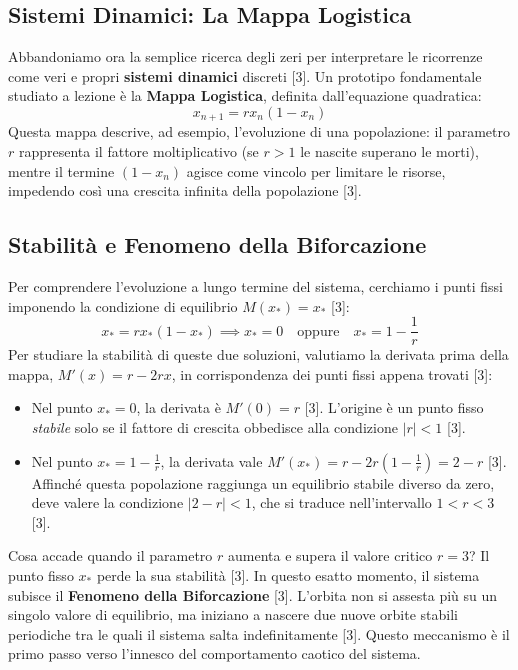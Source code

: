 \documentclass[12pt,a4paper]{article}
\begin{document}
\subsection{Sistemi Dinamici: La Mappa Logistica}
Abbandoniamo ora la semplice ricerca degli zeri per interpretare le ricorrenze come veri e propri \textbf{sistemi dinamici} discreti [3]. Un prototipo fondamentale studiato a lezione è la \textbf{Mappa Logistica}, definita dall'equazione quadratica:
\begin{equation}
x_{n+1} = r x_n (1 - x_n)
\end{equation}
Questa mappa descrive, ad esempio, l'evoluzione di una popolazione: il parametro $r$ rappresenta il fattore moltiplicativo (se $r>1$ le nascite superano le morti), mentre il termine $(1-x_n)$ agisce come vincolo per limitare le risorse, impedendo così una crescita infinita della popolazione [3].

\subsection{Stabilità e Fenomeno della Biforcazione}
Per comprendere l'evoluzione a lungo termine del sistema, cerchiamo i punti fissi imponendo la condizione di equilibrio $M(x_*) = x_*$ [3]:
\begin{equation}
x_* = r x_* (1 - x_*) \implies x_* = 0 \quad \text{oppure} \quad x_* = 1 - \frac{1}{r}
\end{equation}
Per studiare la stabilità di queste due soluzioni, valutiamo la derivata prima della mappa, $M'(x) = r - 2rx$, in corrispondenza dei punti fissi appena trovati [3]:
\begin{itemize}
    \item Nel punto $x_* = 0$, la derivata è $M'(0) = r$ [3]. L'origine è un punto fisso \textit{stabile} solo se il fattore di crescita obbedisce alla condizione $|r| < 1$ [3].
    \item Nel punto $x_* = 1 - \frac{1}{r}$, la derivata vale $M'(x_*) = r - 2r\left(1 - \frac{1}{r}\right) = 2 - r$ [3]. Affinché questa popolazione raggiunga un equilibrio stabile diverso da zero, deve valere la condizione $|2 - r| < 1$, che si traduce nell'intervallo $1 < r < 3$ [3].
\end{itemize}

Cosa accade quando il parametro $r$ aumenta e supera il valore critico $r = 3$? Il punto fisso $x_*$ perde la sua stabilità [3]. In questo esatto momento, il sistema subisce il \textbf{Fenomeno della Biforcazione} [3]. L'orbita non si assesta più su un singolo valore di equilibrio, ma iniziano a nascere due nuove orbite stabili periodiche tra le quali il sistema salta indefinitamente [3]. Questo meccanismo è il primo passo verso l'innesco del comportamento caotico del sistema.
\end{document}
